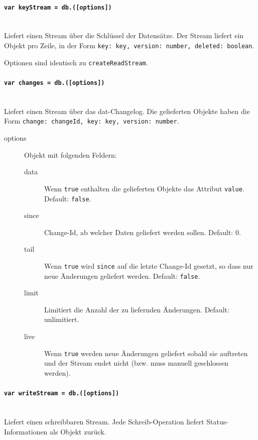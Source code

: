 
\paragraph{\texttt{var keyStream = db.([options])}} ~\\
Liefert einen Stream über die Schlüssel der Datensätze. Der Stream liefert ein Objekt pro Zeile, in der Form \texttt{{key: key, version: number, deleted: boolean}}.

Optionen sind identisch zu \texttt{createReadStream}.


\paragraph{\texttt{var changes = db.([options])}} ~\\
Liefert einen Stream über das dat-Changelog. Die gelieferten Objekte haben die Form \texttt{{change: changeId, key: key, version: number}}.

\begin{description}
\item[options] Objekt mit folgenden Feldern:
    \begin{description}
    \item[data] Wenn \texttt{true} enthalten die gelieferten Objekte das Attribut \texttt{value}. Default: \texttt{false}.
    \item[since] Change-Id, ab welcher Daten geliefert werden sollen. Default: 0.
    \item[tail] Wenn \texttt{true} wird \texttt{since} auf die letzte Change-Id gesetzt, so dass nur neue Änderungen geliefert werden. Default: \texttt{false}.
    \item[limit] Limitiert die Anzahl der zu liefernden Änderungen. Default: unlimitiert.
    \item[live] Wenn \texttt{true} werden neue Änderungen geliefert sobald sie auftreten und der Stream endet nicht (bzw. muss manuell geschlossen werden).
    \end{description}
\end{description}


\paragraph{\texttt{var writeStream = db.([options])}} ~\\
Liefert einen schreibbaren Stream. Jede Schreib-Operation liefert Status-Informationen als Objekt zurück.

